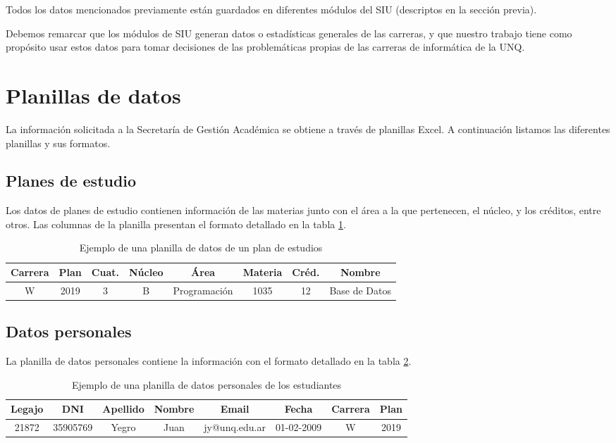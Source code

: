 Todos los datos mencionados previamente están guardados en diferentes módulos del SIU (descriptos en la sección previa).

Debemos remarcar que los módulos de SIU generan datos o estadísticas generales de las carreras, y que nuestro trabajo tiene como propósito usar estos datos para tomar decisiones de las problemáticas propias de las carreras de informática de la UNQ.



\section[Planillas de datos]{Planillas de datos}

La información solicitada a la Secretaría de Gestión Académica se obtiene a través de planillas Excel. A continuación listamos las diferentes planillas y sus formatos.

\subsection[Planes de estudio]{Planes de estudio}

Los datos de planes de estudio contienen información de las materias junto con el área a la que pertenecen, el núcleo, y los créditos, entre otros.
Las columnas de la planilla presentan el formato detallado en la tabla \ref{tab:tabla_planes}.

\begin{table}[!htbp]
    \centering
    \begin{tabular}{|c|c|c|c|c|c|c|c|}
    \hline
    Carrera & Plan & Cuat. & Núcleo & Área & Materia & Créd. & Nombre \\ \hline
    W & 2019 & 3 & B & Programación & 1035 & 12 & Base de Datos  \\
    \hline
    \end{tabular}
    \caption{Ejemplo de una planilla de datos de un plan de estudios}
    \label{tab:tabla_planes}
\end{table}

\subsection[Datos personales]{Datos personales}

La planilla de datos personales contiene la información con el formato detallado en la tabla \ref{tab:tabla_datos}.

\begin{table}[!htbp]
    \centering
    \begin{tabular}{|c|c|c|c|c|c|c|c|}
    \hline
    Legajo & DNI & Apellido & Nombre & Email & Fecha & Carrera & Plan \\ \hline
    21872 & 35905769 & Yegro & Juan & jy@unq.edu.ar & 01-02-2009 & W & 2019 \\
    \hline
    \end{tabular}
    \caption{Ejemplo de una planilla de datos personales de los estudiantes}
    \label{tab:tabla_datos}
\end{table}

